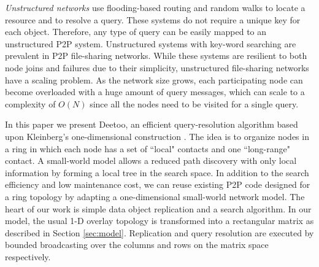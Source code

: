 \emph{Unstructured networks} %
use flooding-based routing and random walks to locate a resource and to
resolve a query. These systems
do not require a unique key for each object.
Therefore, any type of query can be easily mapped to an
unstructured P2P system.
Unstructured systems with key-word searching are prevalent in P2P
file-sharing networks. While these systems are resilient to both node
joins and failures due to their simplicity, unstructured
file-sharing networks have a scaling problem. As the network size grows,
each participating node can become overloaded with a huge amount of
query messages, which can scale to a complexity of  $O(N)$
since all the nodes need to be visited for a single query. 

In this paper we present Deetoo, an efficient query-resolution 
algorithm based upon Kleinberg's one-dimensional construction
\cite{jk:Algorithmic}. The idea is to organize nodes in a ring in which 
each node has a set of ``local" contacts and one ``long-range" 
contact. 
A small-world model allows a reduced path discovery 
with only local information by forming a local tree in the search space. 
In addition to the search efficiency and low maintenance cost, 
we can reuse existing P2P code designed for a ring topology by adapting 
a one-dimensional small-world network model.
The heart of our work is simple data object replication and a search 
algorithm. In our model, the usual 1-D
overlay topology is transformed into a rectangular 
matrix as described in Section \ref{sec:model}.  Replication and 
query resolution are executed by bounded broadcasting over the 
columns and rows on the matrix space respectively.

